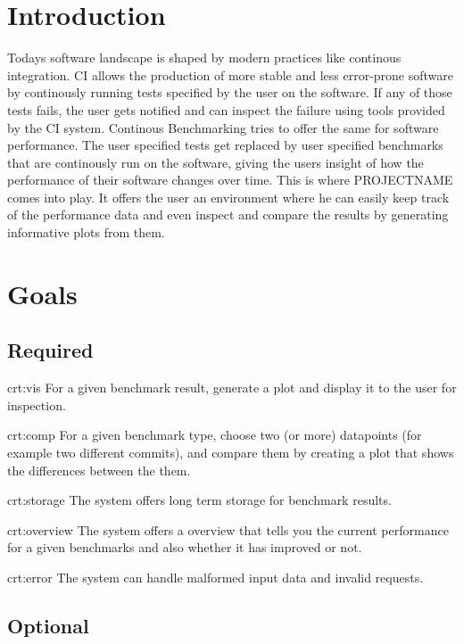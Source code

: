 \section{Introduction}

Todays software landscape is shaped by modern practices like continous integration. CI allows the production of more stable and less error-prone software by continously running tests specified by the user on the software. If any of those tests fails, the user gets notified and can inspect the failure using tools provided by the CI system. Continous Benchmarking tries to offer the same for software performance. The user specified tests get replaced by user specified benchmarks that are continously run on the software, giving the users insight of how the performance of their software changes over time. This is where PROJECTNAME comes into play. It offers the user an environment where he can easily keep track of the performance data and even inspect and compare the results by generating informative plots from them. 

\section{Goals}

\subsection{Required}

{crt:vis}
{For a given benchmark result, generate a \gls{plot} and display it to the user for inspection.}

{crt:comp}
{For a given benchmark type, choose two (or more) datapoints (for example two different commits), and compare them by creating a plot that shows the differences between the them.}

{crt:storage}
{The system offers long term storage for benchmark results.}

{crt:overview}
{The system offers a overview that tells you the current performance for a given benchmarks and also whether it has improved or not.}

{crt:error}
{The system can handle malformed input data and invalid requests.}

\subsection{Optional}

